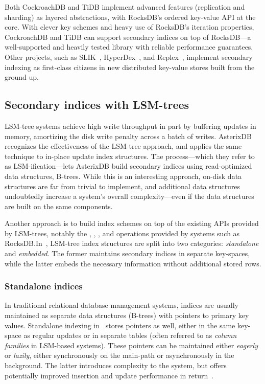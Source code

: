Both CockroachDB and TiDB implement advanced features (\eg replication and
sharding) as layered abstractions, with RocksDB's ordered key-value API at the
core. With clever key schemes and heavy use of RocksDB's iteration properties,
CockroachDB and TiDB can support secondary indices on top of RocksDB---a
well-supported and heavily tested library with reliable performance guarantees.
Other projects, such as SLIK~\cite{slik}, HyperDex~\cite{hyperdex}, and
Replex~\cite{replex}, implement secondary indexing as first-class citizens in
new distributed key-value stores built from the ground up.

\subsection{Secondary indices with LSM-trees}

LSM-tree systems achieve high write throughput in part by buffering updates in
memory, amortizing the disk write penalty across a batch of writes.
AsterixDB~\cite{asterix-storage} recognizes the effectiveness of the LSM-tree
approach, and applies the same technique to in-place update index structures.
The process---which they refer to as LSM-ification---lets AsterixDB build
secondary indices using read-optimized data structures, \eg B-trees. While this
is an interesting approach, on-disk data structures are far from trivial to
implement, and additional data structures undoubtedly increase a system's
overall complexity---even if the data structures are built on the same
components.

Another approach is to build index schemes on top of the existing APIs provided
by LSM-trees, notably the , , , and 
operations provided by systems such as RocksDB.\@ In~\cite{lsm-comparison},
LSM-tree index structures are split into two categories: \textit{standalone} and
\textit{embedded}. The former maintains secondary indices in separate
key-spaces, while the latter embeds the necessary information without additional
stored rows.

\subsubsection{Standalone indices}

In traditional relational database management systems, indices are usually
maintained as separate data structures (\eg B-trees) with pointers to primary
key values. Standalone indexing in~\cite{lsm-comparison} stores pointers as
well, either in the same key-space as regular updates or in separate tables
(often referred to as \textit{column families} in LSM-based systems). These
pointers can be maintained either \textit{eagerly} or \textit{lazily}, \eg
either synchronously on the main-path or asynchronously in the background. The
latter introduces complexity to the system, but offers potentially improved
insertion and update performance in return~\cite{deli, pnuts}.

